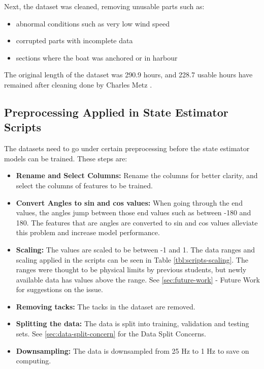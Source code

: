 \documentclass[12pt,twoside]{report}
\begin{document}
Next, the dataset was cleaned, removing unusable parts such as:
\begin{itemize}
    \item abnormal conditions such as very low wind speed
    \item corrupted parts with incomplete data
    \item sections where the boat was anchored or in harbour
\end{itemize}

The original length of the dataset was 290.9 hours, and 228.7 usable hours have remained after cleaning done by Charles Metz \cite{charles}.

\subsection{Preprocessing Applied in State Estimator Scripts}
The datasets need to go under certain preprocessing before the state estimator models can be trained. These steps are:

\begin{itemize}
    \item \textbf{Rename and Select Columns:} Rename the columns for better clarity, and select the columns of features to be trained.
    \item \textbf{Convert Angles to sin and cos values:} When going through the end values, the angles jump between those end values such as between -180 and 180. The features that are angles are converted to sin and cos values alleviate this problem and increase model performance.
    \item \textbf{Scaling:} The values are scaled to be between -1 and 1. The data ranges and scaling applied in the scripts can be seen in Table \ref{tbl:scripts-scaling}. The ranges were thought to be physical limits by previous students, but newly available data has values above the range. See \ref{sec:future-work} - Future Work for suggestions on the issue.
    \item \textbf{Removing tacks:} The tacks in the dataset are removed.
    \item \textbf{Splitting the data:} The data is split into training, validation and testing sets. See \ref{sec:data-split-concern} for the Data Split Concerns.
    \item \textbf{Downsampling:} The data is downsampled from 25 Hz to 1 Hz to save on computing.
\end{itemize}
\end{document}
